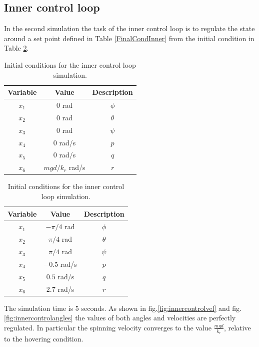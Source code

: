 \documentclass[11pt,a4paper]{scrartcl}
\begin{document}
\subsection*{Inner control loop}

In the second simulation the task of the inner control loop is to regulate the state around a set point defined in Table \ref{FinalCondInner} from the initial condition in Table \ref{InitCondInner}.

\begin{table}
\parbox{.45\linewidth}{
	\begin{tabular}{c c c}
		\toprule
		Variable & Value & Description \\
		\midrule 
		$x_1$  & $0$ rad & $\phi$ \\
		$x_2$  & $0$ rad & $\theta$ \\
		$x_3$  & $0$ rad & $\psi$ \\
		$x_4$  & $0$ rad/s & $p$ \\
		$x_5$  & $0$ rad/s & $q$ \\
		$x_6$  & $mgd/k_r$ rad/s & $r$ \\
		\bottomrule
	\end{tabular}
	\caption{Final set point for the inner control loop simulation.}
	\label{FinalCondInner}
}
\hfill
\parbox{.45\linewidth}{	
	\begin{tabular}{c c c}
		\toprule
		Variable & Value & Description \\
		\midrule 
		$x_1$  & $-\pi/4$ rad & $\phi$ \\
		$x_2$  & $\pi/4$ rad & $\theta$ \\
		$x_3$  & $\pi/4$ rad & $\psi$ \\
		$x_4$  & $-0.5$ rad/s & $p$ \\
		$x_5$  & $0.5$ rad/s & $q$ \\
		$x_6$  & $2.7$ rad/s & $r$ \\
		\bottomrule
	\end{tabular}
	\caption{Initial conditions for the inner control loop simulation.}
	\label{InitCondInner}
}
\end{table}

The simulation time is $ 5 $ seconds. As shown in fig.\ref{fig:innercontrolvel} and fig.\ref{fig:innercontrolangles} the values of both angles and velocities are perfectly regulated. In particular the spinning velocity converges to the value $ \frac{mgd}{k_r} $, relative to the hovering condition.
\end{document}
